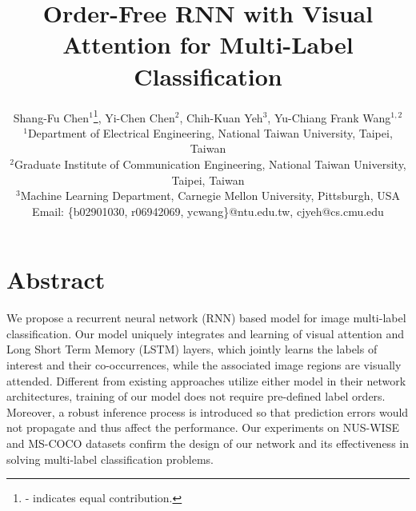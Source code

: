 \documentclass[letterpaper]{article} %
\begin{document}
\title{Order-Free RNN with Visual Attention
for Multi-Label Classification}
\author{Shang-Fu Chen$^1$\thanks{ - indicates equal contribution.}, Yi-Chen Chen$^2$\footnotemark[1], Chih-Kuan Yeh$^3$, Yu-Chiang Frank Wang$^{1,2}$\\
$^1$Department of Electrical Engineering, National Taiwan University, Taipei, Taiwan\\
$^2$Graduate Institute of Communication Engineering, National Taiwan University, Taipei, Taiwan\\
$^3$Machine Learning Department, Carnegie Mellon University, Pittsburgh, USA\\
Email: \{b02901030, r06942069, ycwang\}@ntu.edu.tw, cjyeh@cs.cmu.edu
}
\maketitle
\def \D {\textbf{D}} %
\def \R {\mathbb{R}}

\def \X {\textbf{X}} %
\def \Y {\textbf{Y}} %

\def \x {\textbf{x}} %
\def \y {\textbf{y}} %
\def \hx {\hat{\x}} %
\def \hy {\hat{\y}} %
\def \tl {l} %
\def \ty {\tilde{\y}} %


\def \c {c} %
\def \C {\mathcal{C}} %
\def \pC {\C'}

\def \f {\mathbf{M}} %
\def \fcnn {\f_{map}}
\def \fatt {\f_{att}}
\def \flstm {\f_{pred}}

\def \I {\mathbf{I}} %
\def \V {\mathbf{V}} %
\def \z {\mathbf{z}} %
\def \p {\mathbf{p}} %
\def \h {\mathbf{h}} %

\def \v {\mathbf{v}} %
\def \one {\mathbf{1}}

\def \L {\mathbf{L}} %

\section{Abstract}
\label{sec:abstract}
We propose a recurrent neural network (RNN) based model for image multi-label classification. Our model uniquely integrates and learning of visual attention and Long Short Term Memory (LSTM) layers, which jointly learns the labels of interest and their co-occurrences, while the associated image regions are visually attended. Different from existing approaches utilize either model in their network architectures, training of our model does not require pre-defined label orders. Moreover, a robust inference process is introduced so that prediction errors would not propagate and thus affect the performance. Our experiments on NUS-WISE and MS-COCO datasets confirm the design of our network and its effectiveness in solving multi-label classification problems.
\end{document}
